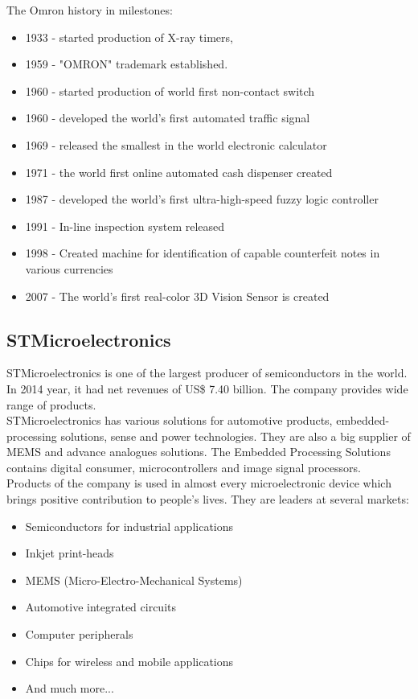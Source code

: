 \documentclass[english]{article}
\begin{document}
The Omron history in milestones:


\begin{itemize}
\item 1933 - started production of X-ray timers,
\item 1959 - "OMRON" trademark established.
\item 1960 - started production of world first non-contact switch 
\item 1960 - developed the world's first automated traffic signal 
\item 1969 - released the smallest in the world electronic calculator
\item 1971 - the world first online automated cash dispenser created
\item 1987 - developed the world's first ultra-high-speed fuzzy logic controller 
\item 1991 - In-line inspection system released
\item 1998 - Created machine for identification of capable counterfeit notes in various currencies
\item 2007 - The world's first real-color 3D Vision Sensor is created
\end{itemize}

\subsection{STMicroelectronics}

STMicroelectronics is one of the largest producer of semiconductors in the world. In 2014 year, it had net revenues of US\$ 7.40 billion. The company provides wide range of products.\\

STMicroelectronics has various solutions for automotive products, embedded-processing solutions, sense and power technologies. They are also a big supplier of MEMS and advance analogues solutions. The Embedded Processing Solutions contains digital consumer, microcontrollers and image signal processors.\\

Products of the company is used in almost every microelectronic device which brings positive contribution to people's lives. They are leaders at several markets:
\begin{itemize}
\item Semiconductors for industrial applications
\item Inkjet print-heads
\item MEMS (Micro-Electro-Mechanical Systems)
\item Automotive integrated circuits
\item Computer peripherals
\item Chips for wireless and mobile applications 
\item And much more...
\end{itemize}
\end{document}
